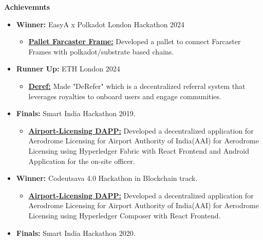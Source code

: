 \documentclass{article}
\begin{document}
\noindent \large \textbf{\textcolor{NavyBlue}{Achievemnts}}
\begin{itemize}[noitemsep,nolistsep,leftmargin=*]
    \item { \normalsize \textbf{Winner:} EasyA x Polkadot London Hackathon 2024
        \begin{itemize}
            \item \normalsize \href{https://github.com/Shritesh99/pallet-farcaster_frame}{\textbf{Pallet Farcaster Frame:}} Developed a pallet to connect Farcaster Frames with polkadot/substrate based chains.
        \end{itemize}
    }
    \item { \normalsize \textbf{Runner Up:} ETH London 2024
        \begin{itemize}
            \item \normalsize \href{https://github.com/Shritesh99/deref}{\textbf{Deref:}}  Made "DeRefer" which is a decentralized referral system that leverages royalties to onboard users and engage communities.
        \end{itemize}
    }
    \item { \normalsize \textbf{Finals:} Smart India Hackathon 2019. 
        \begin{itemize}
            \item \normalsize \href{https://github.com/Shritesh99/airport}{\textbf{Airport-Licensing DAPP:}} Developed a decentralized application for Aerodrome Licensing for Airport Authority of India(AAI) for Aerodrome Licensing using Hyperledger Fabric with React Frontend and Android Application for the on-site officer.
        \end{itemize}
    }
    \item { \normalsize \textbf{Winner:} Codeutsava 4.0 Hackathon in Blockchain track.
        \begin{itemize}
            \item \normalsize \href{https://github.com/Shritesh99/airport}{\textbf{Airport-Licensing DAPP:}} Developed a decentralized application for Aerodrome Licensing for Airport Authority of India(AAI) for Aerodrome Licensing using Hyperledger Composer with React Frontend.
        \end{itemize}
    }
    \item { \normalsize \textbf{Finals:} Smart India Hackathon 2020. 
}
\end{itemize}
\end{document}
